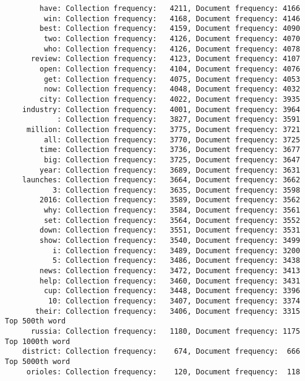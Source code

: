 \documentclass{article}
\begin{document}
\begin{verbatim}
        have: Collection frequency:   4211, Document frequency: 4166
         win: Collection frequency:   4168, Document frequency: 4146
        best: Collection frequency:   4159, Document frequency: 4090
         two: Collection frequency:   4126, Document frequency: 4070
         who: Collection frequency:   4126, Document frequency: 4078
      review: Collection frequency:   4123, Document frequency: 4107
        open: Collection frequency:   4104, Document frequency: 4076
         get: Collection frequency:   4075, Document frequency: 4053
         now: Collection frequency:   4048, Document frequency: 4032
        city: Collection frequency:   4022, Document frequency: 3935
    industry: Collection frequency:   4001, Document frequency: 3964
            : Collection frequency:   3827, Document frequency: 3591
     million: Collection frequency:   3775, Document frequency: 3721
         all: Collection frequency:   3770, Document frequency: 3725
        time: Collection frequency:   3736, Document frequency: 3677
         big: Collection frequency:   3725, Document frequency: 3647
        year: Collection frequency:   3689, Document frequency: 3631
    launches: Collection frequency:   3664, Document frequency: 3662
           3: Collection frequency:   3635, Document frequency: 3598
        2016: Collection frequency:   3589, Document frequency: 3562
         why: Collection frequency:   3584, Document frequency: 3561
         set: Collection frequency:   3564, Document frequency: 3552
        down: Collection frequency:   3551, Document frequency: 3531
        show: Collection frequency:   3540, Document frequency: 3499
           i: Collection frequency:   3489, Document frequency: 3200
           5: Collection frequency:   3486, Document frequency: 3438
        news: Collection frequency:   3472, Document frequency: 3413
        help: Collection frequency:   3460, Document frequency: 3431
         cup: Collection frequency:   3448, Document frequency: 3396
          10: Collection frequency:   3407, Document frequency: 3374
       their: Collection frequency:   3406, Document frequency: 3315
Top 500th word
      russia: Collection frequency:   1180, Document frequency: 1175
Top 1000th word
    district: Collection frequency:    674, Document frequency:  666
Top 5000th word
     orioles: Collection frequency:    120, Document frequency:  118



\end{verbatim}
\end{document}
